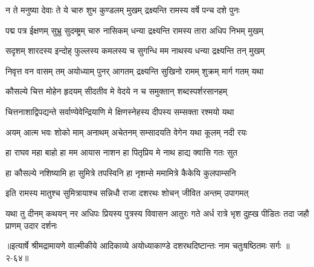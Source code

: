 \twolineshloka
{न ते मनुष्या देवाः ते ये चारु शुभ कुण्डलम्}
{मुखम् द्रक्ष्यन्ति रामस्य वर्षे पन्च दशे पुनः} %

\twolineshloka
{पद्म पत्र ईक्षणम् सुभ्रु सुदम्ष्ट्रम् चारु नासिकम्}
{धन्या द्रक्ष्यन्ति रामस्य तारा अधिप निभम् मुखम्} %

\twolineshloka
{सदृशम् शारदस्य इन्दोह् फुल्लस्य कमलस्य च}
{सुगन्धि मम नाथस्य धन्या द्रक्ष्यन्ति तन् मुखम्} %

\twolineshloka
{निवृत्त वन वासम् तम् अयोध्याम् पुनर् आगतम्}
{द्रक्ष्यन्ति सुखिनो रामम् शुक्रम् मार्ग गतम् यथा} %

\twolineshloka
{कौसल्ये चित्त मोहेन हृदयम् सीदतीव मे}
{वेदये न च समुक्तान् शब्दस्पर्शरसानहम्} %

\twolineshloka
{चित्तनाशाद्विपद्यन्ते सर्वाण्येवेन्द्रियाणि मे}
{क्षिणस्नेहस्य दीपस्य सम्सक्ता रश्मयो यथा} %

\twolineshloka
{अयम् आत्म भवः शोको माम् अनाथम् अचेतनम्}
{सम्सादयति वेगेन यथा कूलम् नदी रयः} %

\twolineshloka
{हा राघव महा बाहो हा मम आयास नाशन}
{हा पितृप्रिय मे नाथ हाद्य क्वासि गतः सुत} %

\twolineshloka
{हा कौसल्ये नशिष्यामि हा सुमित्रे तपस्विनि}
{हा नृशम्से ममामित्रे कैकेयि कुलपाम्सनि} %

\twolineshloka
{इति रामस्य मातुश्च सुमित्रायाश्च सन्निधौ}
{राजा दशरथः शोचन् जीवित अन्तम् उपागमत्} %

\fourlineindentedshloka
{यथा तु दीनम् कथयन् नर अधिपः}
{प्रियस्य पुत्रस्य विवासन आतुरः}
{गते अर्ध रात्रे भृश दुह्ख पीडितः}
{तदा जहौ प्राणम् उदार दर्शनः} %


॥इत्यार्षे श्रीमद्रामायणे वाल्मीकीये आदिकाव्ये अयोध्याकाण्डे दशरथदिष्टान्तः नाम चतुःषष्ठितमः सर्गः ॥२-६४॥
